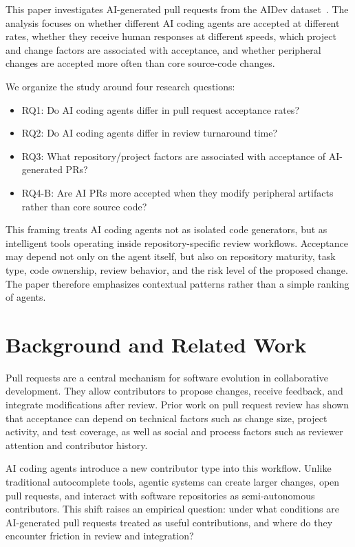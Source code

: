 \documentclass[sigconf,nonacm]{acmart}
\begin{document}
This paper investigates AI-generated pull requests from the AIDev dataset~\cite{aidev_dataset,aidev_repo}. The analysis focuses on whether different AI coding agents are accepted at different rates, whether they receive human responses at different speeds, which project and change factors are associated with acceptance, and whether peripheral changes are accepted more often than core source-code changes.

We organize the study around four research questions:

\begin{itemize}
  \item RQ1: Do AI coding agents differ in pull request acceptance rates?
  \item RQ2: Do AI coding agents differ in review turnaround time?
  \item RQ3: What repository/project factors are associated with acceptance of AI-generated PRs?
  \item RQ4-B: Are AI PRs more accepted when they modify peripheral artifacts rather than core source code?
\end{itemize}

This framing treats AI coding agents not as isolated code generators, but as intelligent tools operating inside repository-specific review workflows. Acceptance may depend not only on the agent itself, but also on repository maturity, task type, code ownership, review behavior, and the risk level of the proposed change. The paper therefore emphasizes contextual patterns rather than a simple ranking of agents.

\section{Background and Related Work}

Pull requests are a central mechanism for software evolution in collaborative development. They allow contributors to propose changes, receive feedback, and integrate modifications after review. Prior work on pull request review has shown that acceptance can depend on technical factors such as change size, project activity, and test coverage, as well as social and process factors such as reviewer attention and contributor history.

AI coding agents introduce a new contributor type into this workflow. Unlike traditional autocomplete tools, agentic systems can create larger changes, open pull requests, and interact with software repositories as semi-autonomous contributors. This shift raises an empirical question: under what conditions are AI-generated pull requests treated as useful contributions, and where do they encounter friction in review and integration?
\end{document}
